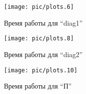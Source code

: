 \begin{figure}
\figalign
\texttt{[image: pic/plots.6]}
\caption{Время работы для ``diag1''}\label{plot-diag1-time}
\end{figure}

\begin{figure}
\figalign
\texttt{[image: pic/plots.8]}
\caption{Время работы для ``diag2''}\label{plot-diag2-time}
\end{figure}

\begin{figure}[b]
\figalign
\texttt{[image: pic/plots.10]}
\caption{Время работы для ``П''}\label{plot-parper-time}
\end{figure}
